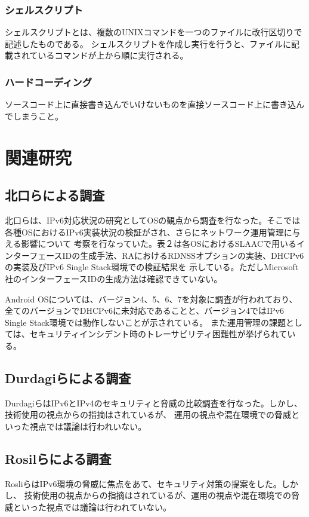 \documentclass[a4j]{jarticle}
\begin{document}
\subsubsection{シェルスクリプト}
シェルスクリプトとは、複数のUNIXコマンドを一つのファイルに改行区切りで記述したものである。
シェルスクリプトを作成し実行を行うと、ファイルに記載されているコマンドが上から順に実行される。

\subsubsection{ハードコーディング}
ソースコード上に直接書き込んでいけないものを直接ソースコード上に書き込んでしまうこと。
\newpage
\section{関連研究} %
\subsection{北口らによる調査}
北口らは、IPv6対応状況の研究としてOSの観点から調査を行なった。そこでは各種OSにおけるIPv6実装状況の検証がされ、さらにネットワーク運用管理に与える影響について
考察を行なっていた。表２は各OSにおけるSLAACで用いるインターフェースIDの生成手法、RAにおけるRDNSSオプションの実装、DHCPv6の実装及びIPv6 Single Stack環境での検証結果を
示している。ただしMicrosoft社のインターフェースIDの生成方法は確認できていない。

Android OSについては、バージョン4、5、6、7を対象に調査が行われており、全てのバージョンでDHCPv6に未対応であることと、バージョン4ではIPv6 Single Stack環境では動作しないことが示されている。
また運用管理の課題としては、セキュリティインシデント時のトレーサビリティ困難性が挙げられている。
\subsection{Durdagiらによる調査}
DurdagiらはIPv6とIPv4のセキュリティと脅威の比較調査を行なった。しかし、技術使用の視点からの指摘はされているが、
運用の視点や混在環境での脅威といった視点では議論は行われいない。

\subsection{Rosilらによる調査}
RosliらはIPv6環境の脅威に焦点をあて、セキュリティ対策の提案をした。しかし、
技術使用の視点からの指摘はされているが、運用の視点や混在環境での脅威といった視点では議論は行われていない。
\end{document}
